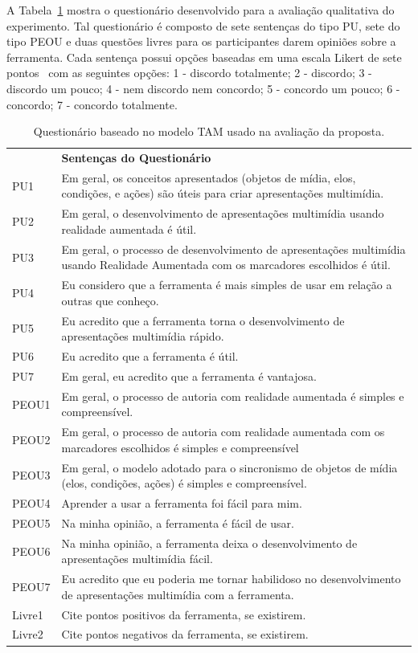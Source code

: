 \documentclass[../main.tex]{subfiles}
\begin{document}
A Tabela~\ref{tab:tam_sentencas} mostra o questionário desenvolvido para a avaliação qualitativa do experimento. Tal questionário é composto de sete sentenças do tipo PU, sete do tipo PEOU e duas questões livres para os participantes darem opiniões sobre a ferramenta. Cada sentença possui opções baseadas em uma escala Likert de sete pontos~\cite{vagias2006likert} com as seguintes opções: 1 - discordo totalmente; 2 - discordo; 3 - discordo um pouco; 4 - nem discordo nem concordo; 5 - concordo um pouco; 6 - concordo; 7 - concordo totalmente.

\begin{table}[htpb]
\caption{Questionário baseado no modelo TAM usado na avaliação da proposta.}
\label{tab:tam_sentencas}
\begin{tabularx}{.95\linewidth}{m{1.3cm} X}
\toprule
 & \textbf{\centering Sentenças do Questionário}
\\\otoprule
PU1 & Em geral, os conceitos apresentados (objetos de mídia, elos, condições, e ações) são úteis para criar apresentações multimídia.
\\\midrule
PU2 & Em geral, o desenvolvimento de apresentações multimídia usando realidade aumentada é útil.
\\\midrule
PU3 & Em geral, o processo de desenvolvimento de apresentações multimídia usando Realidade Aumentada com os marcadores escolhidos é útil.
\\\midrule
PU4 & Eu considero que a ferramenta é mais simples de usar em relação a outras que conheço.
\\\midrule
PU5 & Eu acredito que a ferramenta torna o desenvolvimento de apresentações multimídia rápido.
\\\midrule
PU6 & Eu acredito que a ferramenta é útil.
\\\midrule
PU7 & Em geral, eu acredito que a ferramenta é vantajosa.
\\\midrule
PEOU1 & Em geral, o processo de autoria com realidade aumentada é simples e compreensível.
\\\midrule
PEOU2 & Em geral, o processo de autoria com realidade aumentada com os marcadores escolhidos é simples e compreensível
\\\midrule
PEOU3 & Em geral, o modelo adotado para o sincronismo de objetos de mídia (elos, condições, ações) é simples e compreensível.
\\\midrule
PEOU4 & Aprender a usar a ferramenta foi fácil para mim.
\\\midrule
PEOU5 & Na minha opinião, a ferramenta é fácil de usar.
\\\midrule
PEOU6 & Na minha opinião, a ferramenta deixa o desenvolvimento de apresentações multimídia fácil.
\\\midrule
PEOU7 & Eu acredito que eu poderia me tornar habilidoso no desenvolvimento de apresentações multimídia com a ferramenta.
\\\midrule
Livre1 & Cite pontos positivos da ferramenta, se existirem.
\\\midrule
Livre2 & Cite pontos negativos da ferramenta, se existirem.
\\\bottomrule
\end{tabularx}
\end{table}
\end{document}
